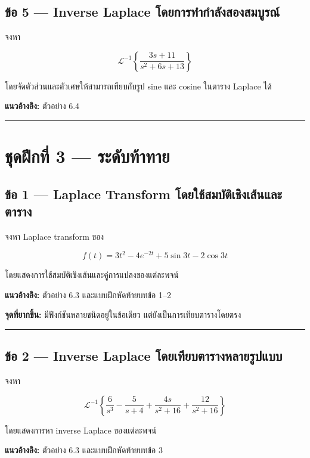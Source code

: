 \subsection{ข้อ 5 — Inverse Laplace โดยการทำกำลังสองสมบูรณ์}

จงหา

\[
\mathcal{L}^{-1}
\left\{
\frac{3s+11}{s^2+6s+13}
\right\}
\]

โดยจัดตัวส่วนและตัวเศษให้สามารถเทียบกับรูป sine และ cosine ในตาราง Laplace ได้

\textbf{แนวอ้างอิง:} ตัวอย่าง 6.4

\par\noindent\rule{\textwidth}{0.4pt}\par

\newpage

\section{ชุดฝึกที่ 3 — ระดับท้าทาย}

\subsection{ข้อ 1 — Laplace Transform โดยใช้สมบัติเชิงเส้นและตาราง}

จงหา Laplace transform ของ

\[
f(t)=3t^2-4e^{-2t}+5\sin 3t-2\cos 3t
\]

โดยแสดงการใช้สมบัติเชิงเส้นและคู่การแปลงของแต่ละพจน์

\textbf{แนวอ้างอิง:} ตัวอย่าง 6.3 และแบบฝึกหัดท้ายบทข้อ 1–2

\textbf{จุดที่ยากขึ้น:} มีฟังก์ชันหลายชนิดอยู่ในข้อเดียว แต่ยังเป็นการเทียบตารางโดยตรง

\par\noindent\rule{\textwidth}{0.4pt}\par

\subsection{ข้อ 2 — Inverse Laplace โดยเทียบตารางหลายรูปแบบ}

จงหา

\[
\mathcal{L}^{-1}
\left\{
\frac{6}{s^3}
-\frac{5}{s+4}
+\frac{4s}{s^2+16}
+\frac{12}{s^2+16}
\right\}
\]

โดยแสดงการหา inverse Laplace ของแต่ละพจน์

\textbf{แนวอ้างอิง:} ตัวอย่าง 6.3 และแบบฝึกหัดท้ายบทข้อ 3

